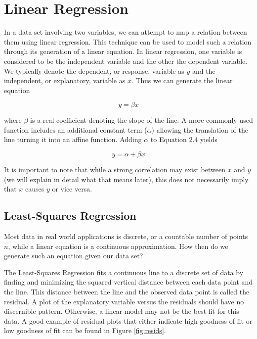 \section{Linear Regression}

In a data set involving two variables, we can attempt to map a relation between them using linear regression. This technique can be used to model such a relation through its generation of a linear equation. In linear regression, one variable is considered to be the independent variable and the other the dependent variable. We typically denote the dependent, or response, variable as $y$ and the independent, or explanatory, variable as $x$. Thus we can generate the linear equation

\begin{equation}
    y = \beta x
\end{equation}

where $\beta$ is a real coefficient denoting the slope of the line. A more commonly used function includes an additional constant term ($\alpha$) allowing the translation of the line turning it into an affine function. Adding $\alpha$ to Equation 2.4 yields

\begin{equation}
    y = \alpha + \beta x
\end{equation}

It is important to note that while a strong correlation may exist between $x$ and $y$ (we will explain in detail what that means later), this does not necessarily imply that $x$ causes $y$ or vice versa.

\subsection{Least-Squares Regression}

Most data in real world applications is discrete, or a countable number of points $n$, while a linear equation is a continuous approximation. How then do we generate such an equation given our data set?

The Least-Squares Regression fits a continuous line to a discrete set of data by finding and minimizing the squared vertical distance between each data point and the line. This distance between the line and the observed data point is called the residual. A plot of the explanatory variable versus the residuals should have no discernible pattern. Otherwise, a linear model may not be the best fit for this data. A good example of residual plots that either indicate high goodness of fit or low goodness of fit can be found in Figure \ref{fig:resids}.

